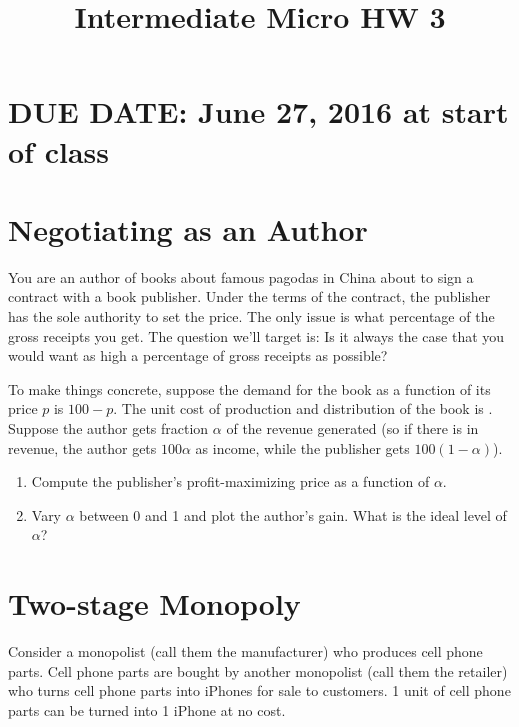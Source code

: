 \documentclass{article}
\begin{document}
\title{Intermediate Micro HW 3}

\maketitle

\section*{DUE DATE: June 27, 2016 at start of class}

\section*{Negotiating as an Author}
You are an author of books about famous pagodas in China about to sign a contract with a book publisher. Under the terms of the contract, the publisher has the sole authority to set the price. The only issue is what percentage of the gross receipts you get. The question we'll target is: Is it always the case that you would want as high a percentage of gross receipts as possible?

To make things concrete, suppose the demand for the book as a function of its price $p$ is $100-p$. The unit cost of production and distribution of the book is . Suppose the author gets fraction $\alpha$ of the revenue generated (so if there is  in revenue, the author gets $100\alpha$ as income, while the publisher gets $100(1-\alpha)$). 

\begin{enumerate}
\item Compute the publisher's profit-maximizing price as a function of $\alpha$.
\item Vary $\alpha$ between 0 and 1 and plot the author's gain. What is the ideal level of $\alpha$?
\end{enumerate}

\section*{Two-stage Monopoly}
Consider a monopolist (call them the manufacturer) who produces cell phone parts. Cell phone parts are bought by another monopolist (call them the retailer) who turns cell phone parts into iPhones for sale to customers. 1 unit of cell phone parts can be turned into 1 iPhone at no cost.
\end{document}
